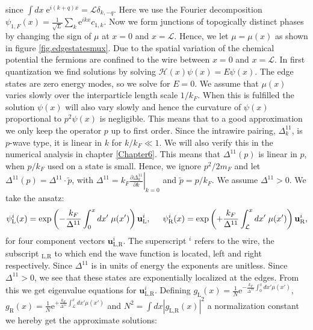 since $\int dx\; \text{e}^{i(k + q)x} =\mathcal{L} \delta_{k,-q} $. Here we use the Fourier decomposition $\psi_{1,F}(x) = \frac{1}{\sqrt{L}}\sum_k\text{e}^{ikx}c_{1,k}$. Now we form junctions of topogically distinct phases by changing the sign of $\mu$ at $x = 0$ and $x = \mathcal{L}$. Hence, we let $\mu = \mu(x)$ as shown in figure \ref{fig.edgestatesmux}. Due to the spatial variation of the chemical potential the fermions are confined to the wire between $x = 0$ and $x = \mathcal{L}$. In first quantization we find solutions by solving $\mathcal{H}(x)\psi(x) = E\psi(x)$. The edge states are zero energy modes, so we solve for $E = 0$. We assume that $\mu(x)$ varies slowly over the interparticle length scale $1/k_F$. When this is fulfilled the solution $\psi(x)$ will also vary slowly and hence the curvature of $\psi(x)$ proportional to $p^2\psi(x)$ is negligible. This means that to a good approximation we only keep the operator $p$ up to first order. Since the intrawire pairing, $\Delta^{11}_k$, is $p$-wave type, it is linear in $k$ for $k/k_F \ll 1$. We will also verify this in the numerical analysis in chapter \ref{Chapter6}. This means that $\Delta^{11}(p)$ is linear in $p$, when $p/k_F$ used on a state is small. Hence, we ignore $p^2/2m_F$ and let $\Delta^{11}(p) = \Delta^{11} \cdot \tilde{p}$, with $\Delta^{11} = k_F\left.\frac{\partial \Delta^{11}_k}{\partial k}\right|_{k=0}$ and $\tilde{p} = p/k_F$. We assume $\Delta^{11} > 0$. We take the ansatz:
\begin{equation}
\psi^{i}_{\text{L}}(x) = \exp\left(-\frac{k_F}{\Delta^{11}}\int_{0}^{x} dx'\; \mu(x') \right)\mathbf{u}^{i}_{\text{L}}, \hspace{0.5cm} \psi^{i}_{\text{R}}(x) = \exp\left(+\frac{k_F}{\Delta^{11}}\int_{\mathcal{L}}^{x} dx'\; \mu(x') \right)\mathbf{u}^{i}_{\text{R}}, \nonumber
\end{equation}  
for four component vectors $\mathbf{u}^{i}_{\text{L,R}}$. The superscript ${}^i$ refers to the wire, the subscript ${}_{\text{L,R}}$ to which end the wave function is located, left and right respectively. Since $\Delta^{11}$ is in units of energy the exponents are unitless. Since $\Delta^{11} > 0$, we see that these states are exponentially localized at the edges. From this we get eigenvalue equations for $\mathbf{u}^{i}_{\text{L,R}}$. Defining $g_\text{L}(x) = \frac{1}{N}\text{e}^{-\frac{k_F}{\Delta^{11}}\int_{0}^{x} dx' \mu(x')}$, $g_\text{R}(x) = \frac{1}{N}\text{e}^{+\frac{k_F}{\Delta^{11}}\int_{\mathcal{L}}^{x} dx' \mu(x')}$ and $N^2 = \int dx |g_{\text{L,R}}(x)|^2$ a normalization constant we hereby get the approximate solutions:
